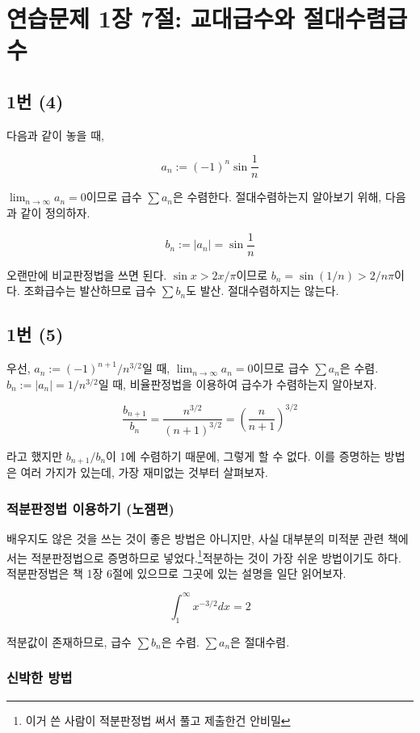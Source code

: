\section{연습문제 1장 7절: 교대급수와 절대수렴급수}

\subsection{1번 (4)}
다음과 같이 놓을 때,

\[
a_n:=(-1)^n\sin \frac{1}{n}
\]

$\lim_{n\to\infty}a_n=0$이므로 급수 $\sum a_n$은 수렴한다. 절대수렴하는지 알아보기 위해, 다음과 같이 정의하자.

\[
b_n:=|a_n|=\sin \frac{1}{n}
\]

오랜만에 비교판정법을 쓰면 된다. $\sin x>2x/\pi$이므로 $b_n=\sin(1/n)>2/n\pi$이다. 조화급수는 발산하므로 급수 $\sum b_n$도 발산. 절대수렴하지는 않는다.

\subsection{1번 (5)}
우선, $a_n:=(-1)^{n+1}/n^{3/2}$일 때, $\lim_{n\to\infty}a_n=0$이므로 급수 $\sum a_n$은 수렴. $b_n:=|a_n|=1/n^{3/2}$일 때, 비율판정법을 이용하여 급수가 수렴하는지 알아보자.

\[
\frac{b_{n+1}}{b_n}=\frac{n^{3/2}}{(n+1)^{3/2}}=\left(\frac{n}{n+1}\right)^{3/2}
\]

라고 했지만 $b_{n+1}/b_n$이 1에 수렴하기 때문에, 그렇게 할 수 없다. 이를 증명하는 방법은 여러 가지가 있는데, 가장 재미없는 것부터 살펴보자.

\subsubsection{적분판정법 이용하기 (노잼편)}

배우지도 않은 것을 쓰는 것이 좋은 방법은 아니지만, 사실 대부분의 미적분 관련 책에서는 적분판정법으로 증명하므로 넣었다.\footnote{이거 쓴 사람이 적분판정법 써서 풀고 제출한건 안비밀}적분하는 것이 가장 쉬운 방법이기도 하다. 적분판정법은 책 1장 6절에 있으므로 그곳에 있는 설명을 일단 읽어보자.

\[
\int^\infty_1 x^{-3/2}dx=2
\]

적분값이 존재하므로, 급수 $\sum b_n$은 수렴. $\sum a_n$은 절대수렴.

\subsubsection{신박한 방법}

